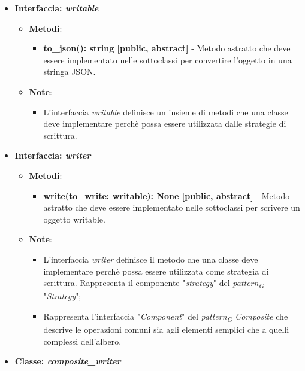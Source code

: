 \begin{itemize}
    \item{\textbf{Interfaccia: \textit{writable}}}
    \begin{itemize}
        \item\textbf{Metodi}: 
        \begin{itemize}
            \item \textbf{to\_json(): string [public, abstract]} - Metodo astratto che deve essere implementato nelle sottoclassi per convertire l'oggetto in una stringa JSON.
        \end{itemize}
        \item\textbf{Note}:
        \begin{itemize}
            \item L'interfaccia \textit{writable} definisce un insieme di metodi che una classe deve implementare perchè possa essere utilizzata dalle strategie di scrittura.
        \end{itemize}
    \end{itemize}
    \item{\textbf{Interfaccia: \textit{writer}}}
     \begin{itemize}
        \item \textbf{Metodi}:
         \begin{itemize}
            \item \textbf{write(to\_write: writable): None [public, abstract]} - Metodo astratto che deve essere implementato nelle sottoclassi per scrivere un oggetto writable.
        \end{itemize}
        \item\textbf{Note}:
        \begin{itemize}
            \item L'interfaccia \textit{writer} definisce il metodo che una classe deve implementare perchè possa essere utilizzata come strategia di scrittura. Rappresenta il componente "\textit{strategy}" del \textit{pattern}\textsubscript{\textit{G}} "\textit{Strategy}";
            \item Rappresenta l'interfaccia "\textit{Component}" del \textit{pattern}\textsubscript{\textit{G}} \textit{Composite} che descrive le operazioni comuni sia agli elementi semplici che a quelli complessi dell'albero.
        \end{itemize}
    \end{itemize}
    \item{\textbf{Classe: \textit{composite\_writer}}}
    \begin{itemize}

\end{itemize}
\end{itemize}
